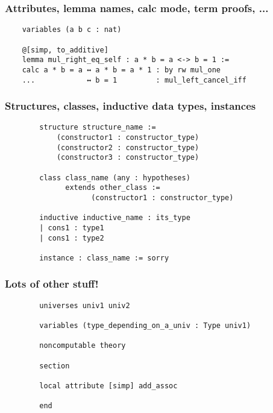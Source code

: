 \documentclass{beamer}
\begin{document}
 \begin{frame}[fragile]
    \frametitle{Attributes, lemma names, calc mode, term proofs, ...}

    \begin{lstlisting}
    variables (a b c : nat)

    @[simp, to_additive] 
    lemma mul_right_eq_self : a * b = a <-> b = 1 :=
    calc a * b = a ↔ a * b = a * 1 : by rw mul_one
    ...            ↔ b = 1         : mul_left_cancel_iff
    \end{lstlisting}
 \end{frame}

\begin{frame}[fragile]
    \frametitle{Structures, classes, inductive data types, instances}

    \begin{lstlisting}
        structure structure_name := 
            (constructor1 : constructor_type)
            (constructor2 : constructor_type)
            (constructor3 : constructor_type)

        class class_name (any : hypotheses) 
              extends other_class :=
                    (constructor1 : constructor_type)

        inductive inductive_name : its_type
        | cons1 : type1
        | cons1 : type2

        instance : class_name := sorry
    \end{lstlisting}

\end{frame}

\begin{frame}[fragile]
    \frametitle{Lots of other stuff!}

    \begin{lstlisting}
        universes univ1 univ2 

        variables (type_depending_on_a_univ : Type univ1)

        noncomputable theory

        section 

        local attribute [simp] add_assoc

        end
    \end{lstlisting}

\end{frame}
\end{document}
